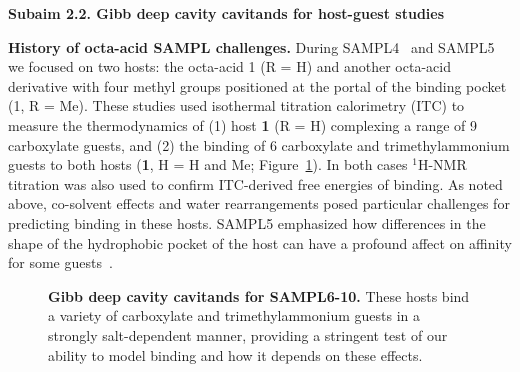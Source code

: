 \documentclass[11pt]{article}
\begin{document}
{\bf Subaim 2.2. Gibb deep cavity cavitands for host-guest studies} 


{\bf History of octa-acid SAMPL challenges.} During SAMPL4~\cite{gibb_binding_2013} and SAMPL5~\cite{sullivan_binding_2016} we focused on two hosts: the octa-acid 1 (R = H) and another octa-acid derivative with four methyl groups positioned at the portal of the binding pocket (1, R = Me). 
These studies used isothermal titration calorimetry (ITC) to measure the thermodynamics of (1) host {\bf 1} (R = H) complexing a range of 9 carboxylate guests,
and (2) the binding of 6 carboxylate and trimethylammonium guests to both hosts ({\bf 1}, H = H and Me; Figure~\ref{figure:gdccs}).  
In both cases $^1$H-NMR titration was also used to confirm ITC-derived free energies of binding.  
As noted above, co-solvent effects and water rearrangements posed particular challenges for predicting binding in these hosts. 
SAMPL5 emphasized how differences in the shape of the hydrophobic pocket of the host can have a profound affect on affinity for some guests~\cite{yin_overview_2016}.

\begin{figure}[h]
\begin{centering}

\end{centering}

\vspace{0.1in}
\caption{\footnotesize {\bf Gibb deep cavity cavitands for SAMPL6-10.} These hosts bind a variety of carboxylate and trimethylammonium guests in a strongly salt-dependent manner, providing a stringent test of our ability to model binding and how it depends on these effects.
\label{figure:gdccs}}
\end{figure}
\end{document}
